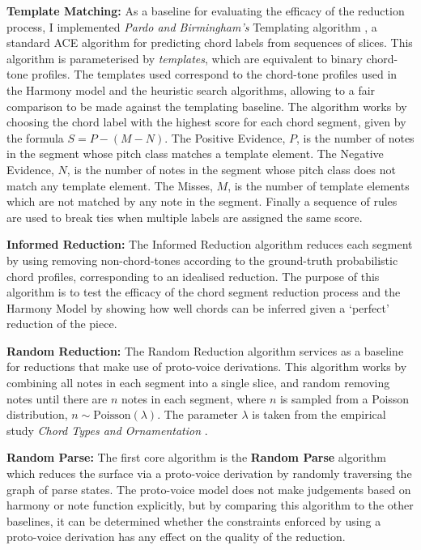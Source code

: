 \documentclass[12pt,a4paper,twoside,openany]{report} \usepackage[pdfborder={0 0 0}]{hyperref}    %
\theoremstyle{definition} \newtheorem{definition}{Definition}[section]
\begin{document}
\textbf{Template Matching: }
As a baseline for evaluating the efficacy of the reduction process, I implemented \textit{Pardo and Birmingham's} 
Templating algorithm \cite{pardoAlgorithmsChordalAnalysis2002},
  a standard ACE algorithm for predicting chord labels from sequences of slices. 
  This algorithm is parameterised by \textit{templates}, which are equivalent to binary chord-tone profiles. 
  The templates used correspond to the chord-tone profiles used in the Harmony model and the heuristic search 
  algorithms, allowing to a fair comparison to be made against the templating baseline. 
  The algorithm works by choosing the chord label with the highest score for each chord segment, given by the formula $S = P - (M
  - N)$. The Positive Evidence, $P$, is the number of notes in the segment whose pitch class matches a template element.
  The Negative Evidence, $N$, is the number of notes in the segment whose pitch class does not match any template
  element. The Misses, $M$, is the number of template elements which are not matched by any note in the segment. Finally
  a sequence of rules are used to break ties when multiple labels are assigned the same score.

\textbf{Informed Reduction: }
The Informed Reduction algorithm reduces each segment by using removing non-chord-tones according to the ground-truth 
probabilistic chord profiles, corresponding to an idealised reduction. The purpose of this algorithm is to test the
efficacy of the chord segment reduction process and the Harmony Model by showing how well chords can be inferred given
a `perfect' reduction of the piece.

\textbf{Random Reduction: }
The Random Reduction algorithm services as a baseline for reductions that make use of proto-voice derivations. This
algorithm works by combining all notes in each segment into a single slice, and random removing notes until there are $n$ 
notes in each segment, where $n$ is sampled from a Poisson distribution, $n \sim \text{Poisson}(\lambda)$. The parameter 
$\lambda$ is taken from the empirical study \textit{Chord Types and Ornamentation}
\cite{finkensiepChordTypesOrnamentation2023}.

\textbf{Random Parse: }
The first core algorithm is the \textbf{Random Parse} algorithm which reduces the surface via a proto-voice derivation by randomly 
traversing the graph of parse states. The proto-voice model does not make judgements based on harmony or note function
explicitly, but by comparing this algorithm to the other baselines, it can be determined whether the constraints
enforced by using a proto-voice derivation has any effect on the quality of the reduction. 
\end{document}
